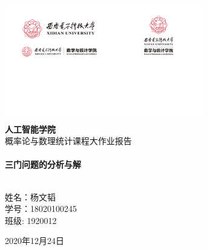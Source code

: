 \begin{titlepage}

\begin{center}


\includegraphics[width=0.65\textwidth]{figure/logo_xdred}\\[1cm]    

\textsc{\LARGE \bfseries 人工智能学院}\\[1.5cm]

\textsc{\Large 概率论与数理统计课程大作业报告}\\[0.5cm]


\HRule \\[0.4cm]
{ \huge \bfseries 三门问题的分析与解}\\[0.4cm]

\HRule \\[1.5cm]

\begin{minipage}{0.4\textwidth}
\begin{center} \large
\textsc {\kaishu 姓名：杨文韬\\学号：18020100245\\班级: 1920012}
\end{center}
\end{minipage}

\vfill

{\large 2020年12月24日}

\end{center}

\end{titlepage}
